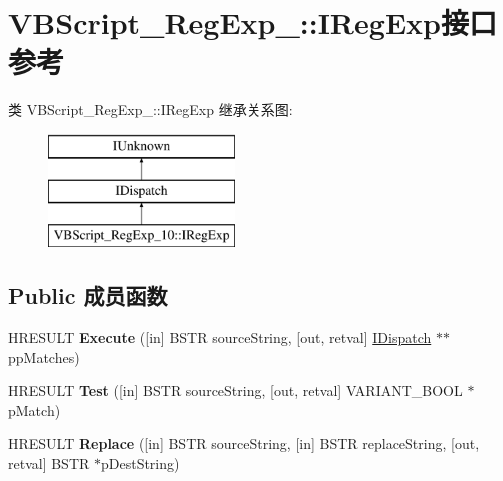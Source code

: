 \hypertarget{interface_v_b_script___reg_exp__10_1_1_i_reg_exp}{}\section{V\+B\+Script\+\_\+\+Reg\+Exp\+\_\+:\+:I\+Reg\+Exp接口 参考}
\label{interface_v_b_script___reg_exp__10_1_1_i_reg_exp}
类 V\+B\+Script\+\_\+\+Reg\+Exp\+\_\+:\+:I\+Reg\+Exp 继承关系图\+:\begin{figure}[H]
\begin{center}
\leavevmode
\includegraphics[height=3.000000cm]{interface_v_b_script___reg_exp__10_1_1_i_reg_exp}
\end{center}
\end{figure}
\subsection*{Public 成员函数}
\begin{DoxyCompactItemize}
\item 
\mbox{\label{interface_v_b_script___reg_exp__10_1_1_i_reg_exp_ad61d23154c7d86ca97eec8b231faa474}} 
H\+R\+E\+S\+U\+LT {\bfseries Execute} (\mbox{[}in\mbox{]} B\+S\+TR source\+String, \mbox{[}out, retval\mbox{]} \hyperlink{interface_i_dispatch}{I\+Dispatch} $\ast$$\ast$pp\+Matches)
\item 
\mbox{\label{interface_v_b_script___reg_exp__10_1_1_i_reg_exp_a24559fdc0c394fc005892214acd9afb3}} 
H\+R\+E\+S\+U\+LT {\bfseries Test} (\mbox{[}in\mbox{]} B\+S\+TR source\+String, \mbox{[}out, retval\mbox{]} V\+A\+R\+I\+A\+N\+T\+\_\+\+B\+O\+OL $\ast$p\+Match)
\item 
\mbox{\label{interface_v_b_script___reg_exp__10_1_1_i_reg_exp_a42357129273c9dd5216cae35b00384a7}} 
H\+R\+E\+S\+U\+LT {\bfseries Replace} (\mbox{[}in\mbox{]} B\+S\+TR source\+String, \mbox{[}in\mbox{]} B\+S\+TR replace\+String, \mbox{[}out, retval\mbox{]} B\+S\+TR $\ast$p\+Dest\+String)
\end{DoxyCompactItemize}
